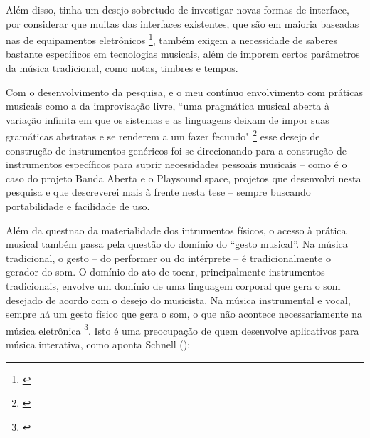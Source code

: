  Além disso, tinha um desejo sobretudo de investigar novas formas de interface, por considerar que muitas das interfaces existentes, que são em maioria baseadas nas de equipamentos eletrônicos \footnote{\cite{Stolfi2016}}, também exigem a necessidade de saberes bastante específicos em tecnologias musicais, além de imporem certos parâmetros da música tradicional, como notas, timbres e tempos. 

Com o desenvolvimento da pesquisa, e o meu contínuo envolvimento com práticas musicais como a da improvisação livre, ``uma pragmática musical aberta à variação infinita em que os sistemas e as linguagens deixam de impor suas gramáticas abstratas e se renderem a um fazer fecundo" \footnote{\cite[2]{Costa2016}} esse desejo de construção de instrumentos genéricos foi se direcionando para a construção de instrumentos específicos para suprir necessidades pessoais musicais -- como é o caso do projeto Banda Aberta e o Playsound.space, projetos que desenvolvi nesta pesquisa e que descreverei mais à frente nesta tese -- sempre buscando portabilidade e facilidade de uso.


Além da questnao da materialidade dos intrumentos físicos, o acesso à prática musical também passa pela questão do domínio do ``gesto musical''. Na música tradicional, o gesto -- do performer ou do intérprete -- é tradicionalmente o gerador do som. O domínio do ato de tocar, principalmente instrumentos tradicionais, envolve um domínio de uma linguagem corporal que gera o som desejado de acordo com o desejo do musicista. Na música instrumental e vocal, sempre há um gesto físico que gera o som, o que não acontece necessariamente na música eletrônica \footnote{\cite[85]{Smalley1996}}. Isto é uma preocupação de quem desenvolve aplicativos para música interativa, como aponta Schnell (\citeyear{Schnell2013}): 


